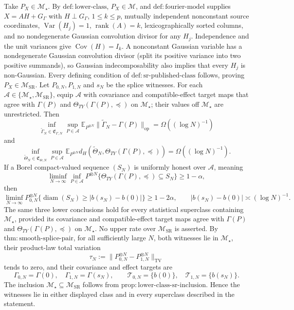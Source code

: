 Take \(P_X\in\mathcal M_\star\).  By \(\mathrm{def:lower\text{-}class}\), \(P_X\in\mathcal M\), and \(\mathrm{def:fourier\text{-}model}\) supplies \(X=AH+G_\Gamma\) with \(H\perp G_\Gamma\), \(1\le k\le p\), mutually independent nonconstant source coordinates, \(\operatorname{Var}(H_j)=1\), \(\operatorname{rank}(A)=k\), lexicographically sorted columns, and no nondegenerate Gaussian convolution divisor for any \(H_j\).  Independence and the unit variances give \(\operatorname{Cov}(H)=I_k\).  A nonconstant Gaussian variable has a nondegenerate Gaussian convolution divisor (split its positive variance into two positive summands), so Gaussian indecomposability also implies that every \(H_j\) is non-Gaussian.  Every defining condition of \(\mathrm{def:sr\text{-}published\text{-}class}\) follows, proving \(P_X\in\mathcal M_{\mathrm{SR}}\).
Let \(P_{0,N},P_{1,N}\) and \(s_N\) be the splice witnesses.  For each \(\mathcal A\in\{\mathcal M_\star,\mathcal M_{\mathrm{SR}}\}\), equip \(\mathcal A\) with covariance and compatible-effect target maps that agree with \(\Gamma(P)\) and \(\Theta_{TY}(\Gamma(P),\preceq)\) on \(\mathcal M_\star\); their values off \(\mathcal M_\star\) are unrestricted.  Then
\[
 \inf_{\widetilde\Gamma_N\in\mathfrak E_{\Gamma,N}}
 \sup_{P\in\mathcal A}
 \mathbb E_{P^{\otimes N}}\|\widetilde\Gamma_N-\Gamma(P)\|_{\mathrm{op}}
 =\Omega((\log N)^{-1})
\]
and
\[
 \inf_{\widetilde\Theta_N\in\mathfrak E_{\Theta,N}}
 \sup_{P\in\mathcal A}
 \mathbb E_{P^{\otimes N}}
 d_H\!\left(\widetilde\Theta_N,\Theta_{TY}(\Gamma(P),\preceq)\right)
 =\Omega((\log N)^{-1}).
\]
If a Borel compact-valued sequence \((S_N)\) is uniformly honest over \(\mathcal A\), meaning
\[
 \liminf_{N\to\infty}\inf_{P\in\mathcal A}P^{\otimes N}
 \{\Theta_{TY}(\Gamma(P),\preceq)\subseteq S_N\}\ge1-\alpha,
\]
then
\[
 \liminf_{N\to\infty}P_{0,N}^{\otimes N}
 \{\operatorname{diam}(S_N)\ge |b(s_N)-b(0)|\}\ge1-2\alpha,
 \qquad |b(s_N)-b(0)|\asymp(\log N)^{-1}.
\]
The same three lower conclusions hold for every statistical superclass containing \(\mathcal M_\star\), provided its covariance and compatible-effect target maps agree with \(\Gamma(P)\) and \(\Theta_{TY}(\Gamma(P),\preceq)\) on \(\mathcal M_\star\).  No upper rate over \(\mathcal M_{\mathrm{SR}}\) is asserted.
By \(\mathrm{thm:smooth\text{-}splice\text{-}pair}\), for all sufficiently large \(N\), both witnesses lie in \(\mathcal M_\star\), their product-law total variation
\[
 \tau_N:=\|P_{0,N}^{\otimes N}-P_{1,N}^{\otimes N}\|_{\mathrm{TV}}
\]
tends to zero, and their covariance and effect targets are
\[
 \Gamma_{0,N}=\Gamma(0),\quad \Gamma_{1,N}=\Gamma(s_N),\qquad
 \mathcal T_{0,N}=\{b(0)\},\quad \mathcal T_{1,N}=\{b(s_N)\}.
\]
The inclusion \(\mathcal M_\star\subseteq\mathcal M_{\mathrm{SR}}\) follows from \(\mathrm{prop:lower\text{-}class\text{-}sr\text{-}inclusion}\).  Hence the witnesses lie in either displayed class and in every superclass described in the statement.

